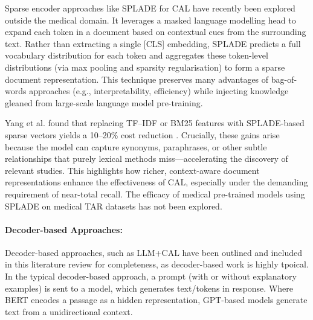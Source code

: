 \documentclass[10pt, english]{article}
\begin{document}
Sparse encoder approaches like SPLADE for CAL have recently been explored outside the medical domain. It leverages a masked language modelling head to expand each token in a document based on contextual cues from the surrounding text. Rather than extracting a single [CLS] embedding, SPLADE predicts a full vocabulary distribution for each token and aggregates these token-level distributions (via max pooling and sparsity regularisation) to form a sparse document representation. This technique preserves many advantages of bag-of-words approaches (e.g., interpretability, efficiency) while injecting knowledge gleaned from large-scale language model pre-training.

Yang et al. found that replacing TF–IDF or BM25 features with SPLADE-based sparse vectors yields a 10–20\% cost reduction \cite{yang_contextualization_2024}. Crucially, these gains arise because the model can capture synonyms, paraphrases, or other subtle relationships that purely lexical methods miss—accelerating the discovery of relevant studies. This highlights how richer, context-aware document representations enhance the effectiveness of CAL, especially under the demanding requirement of near-total recall. The efficacy of medical pre-trained models using SPLADE on medical TAR datasets has not been explored.


\paragraph{Decoder-based Approaches: }
Decoder-based approaches, such as LLM+CAL have been outlined and included in this literature review for completeness, as decoder-based work is highly tpoical. In the typical decoder-based approach, a prompt (with or without explanatory examples) is sent to a model, which generates text/tokens in response. Where BERT encodes a passage as a hidden representation, GPT-based models generate text from a unidirectional context.
\end{document}
